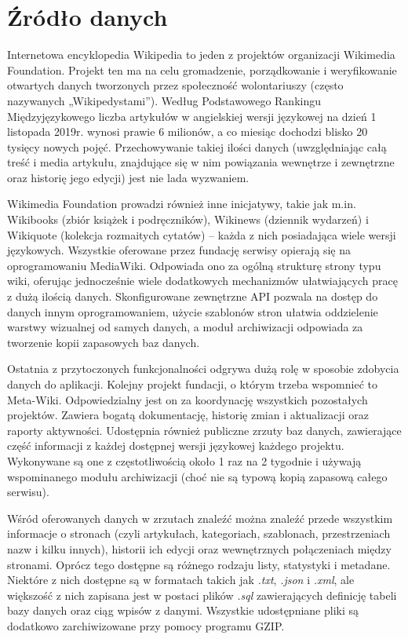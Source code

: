 \section{Źródło danych}
Internetowa encyklopedia Wikipedia to jeden z projektów organizacji Wikimedia Foundation. Projekt ten ma na celu gromadzenie, porządkowanie i weryfikowanie otwartych danych tworzonych przez społeczność wolontariuszy (często nazywanych „Wikipedystami”). Według Podstawowego Rankingu Międzyjęzykowego \cite{Wikipedia:PodstawowyRanking} liczba artykułów w angielskiej wersji językowej na dzień 1 listopada 2019r. wynosi prawie 6 milionów, a co miesiąc dochodzi blisko 20 tysięcy nowych pojęć. Przechowywanie takiej ilości danych (uwzględniając całą treść i media artykułu, znajdujące się w nim powiązania wewnętrze i zewnętrzne oraz historię jego edycji) jest nie lada wyzwaniem.

Wikimedia Foundation prowadzi również inne inicjatywy, takie jak m.in. Wikibooks (zbiór książek i podręczników), Wikinews (dziennik wydarzeń) i Wikiquote (kolekcja rozmaitych cytatów) – każda z nich posiadająca wiele wersji językowych. Wszystkie oferowane przez fundację serwisy opierają się na oprogramowaniu MediaWiki. Odpowiada ono za ogólną strukturę strony typu wiki, oferując jednocześnie wiele dodatkowych mechanizmów ułatwiających pracę z dużą ilością danych. Skonfigurowane zewnętrzne API pozwala na dostęp do danych innym oprogramowaniem, użycie szablonów stron ułatwia oddzielenie warstwy wizualnej od samych danych, a moduł archiwizacji odpowiada za tworzenie kopii zapasowych baz danych.

Ostatnia z przytoczonych funkcjonalności odgrywa dużą rolę w sposobie zdobycia danych do aplikacji. Kolejny projekt fundacji, o którym trzeba wspomnieć to Meta-Wiki. Odpowiedzialny jest on za koordynację wszystkich pozostałych projektów. Zawiera bogatą dokumentację, historię zmian i aktualizacji oraz raporty aktywności. Udostępnia również publiczne zrzuty baz danych, zawierające część informacji z każdej dostępnej wersji językowej każdego projektu. Wykonywane są one z częstotliwością około 1 raz na 2 tygodnie i używają wspominanego modułu archiwizacji (choć nie są typową kopią zapasową całego serwisu).

Wśród oferowanych danych w zrzutach znaleźć można znaleźć przede wszystkim informacje o stronach (czyli artykułach, kategoriach, szablonach, przestrzeniach nazw i kilku innych), historii ich edycji oraz wewnętrznych połączeniach między stronami. Oprócz tego dostępne są różnego rodzaju listy, statystyki i metadane. Niektóre z nich dostępne są w formatach takich jak \textit{.txt}, \textit{.json} i \textit{.xml}, ale większość z nich zapisana jest w postaci plików \textit{.sql} zawierających definicję tabeli bazy danych oraz ciąg wpisów z danymi. Wszystkie udostępniane pliki są dodatkowo zarchiwizowane przy pomocy programu GZIP.